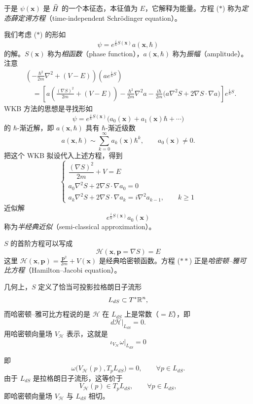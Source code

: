 
于是 $\psi(\mathbf{x})$ 是 $\widehat{H}$ 的一个本征态，本征值为 $E$，它解释为能量。方程 ($*$) 称为\emph{定态薛定谔方程}（time-independent Schrödinger equation）。

我们考虑 ($*$) 的形如
\[
\psi=e^{\frac{i}{\hbar}S(\mathbf{x})}a(\mathbf{x},\hbar)
\]
的解。$S(\mathbf{x})$ 称为\emph{相函数}（phase function），$a(\mathbf{x},\hbar)$ 称为\emph{振幅}（amplitude）。注意
\begin{align*}
&\left(-\frac{\hbar^2}{2m}\nabla^2+(V-E)\right)\left(ae^{\frac{i}{\hbar}S}\right)\\
&\quad=\left[a\left(\frac{(\nabla S)^2}{2m}+(V-E)\right)-\frac{\hbar^2}{2m}\nabla^2a-\frac{i\hbar}{2m}\Big(a\nabla^2S+2\nabla S\cdot\nabla a\Big)\right]e^{\frac{i}{\hbar}S}.
\end{align*}
WKB 方法的思想是寻找形如
\[
\psi=e^{\frac{i}{\hbar}S(\mathbf{x})}\big(a_0(\mathbf{x})+a_1(\mathbf{x})\hbar+\cdots\big)
\]
的 $\hbar$-渐近解，即 $a(\mathbf{x},\hbar)$ 具有 $\hbar$-渐近级数
\[
a(\mathbf{x},\hbar)\sim\sum_{k=0}^{\infty}a_k(\mathbf{x})\hbar^k,\qquad a_0(\mathbf{x})\neq0.
\]
把这个 WKB 拟设代入上述方程，得到
\[
\begin{cases}
\dfrac{(\nabla S)^2}{2m}+V=E\\[8pt]
a_0\nabla^2S+2\nabla S\cdot\nabla a_0=0\\[4pt]
a_k\nabla^2S+2\nabla S\cdot\nabla a_k=i\nabla^2a_{k-1},\qquad k\ge1
\end{cases}
\]
近似解
\[
e^{\frac{i}{\hbar}S(\mathbf{x})}a_0(\mathbf{x})
\]
称为\emph{半经典近似}（semi-classical approximation）。

$S$ 的首阶方程可以写成
\[
\mathcal{H}(\mathbf{x},\mathbf{p}=\nabla S)=E \tag{$**$}
\]
这里 $\mathcal{H}(\mathbf{x},\mathbf{p})=\frac{\mathbf{p}^2}{2m}+V(\mathbf{x})$ 是经典哈密顿函数。方程 ($**$) 正是\emph{哈密顿–雅可比方程}（Hamilton–Jacobi equation）。

几何上，$S$ 定义了恰当可投影拉格朗日子流形
\[
L_{dS}\subset T^*\mathbb{R}^n,
\]
而哈密顿–雅可比方程说的是 $\mathcal{H}$ 在 $L_{dS}$ 上是常数（$=E$），即
\[
d\mathcal{H}|_{L_{dS}}=0.
\]
用哈密顿向量场 $V_{\mathcal{H}}$ 表示，这就是
\[
\iota_{V_{\mathcal{H}}}\omega|_{L_{dS}}=0
\]


即
\[
\omega\big(V_{\mathcal{H}}(p),T_pL_{dS}\big)=0,\qquad \forall p\in L_{dS}.
\]
由于 $L_{dS}$ 是拉格朗日子流形，这等价于
\[
V_{\mathcal{H}}(p)\in T_pL_{dS},\qquad \forall p\in L_{dS},
\]
即哈密顿向量场 $V_{\mathcal{H}}$ 与 $L_{dS}$ 相切。

